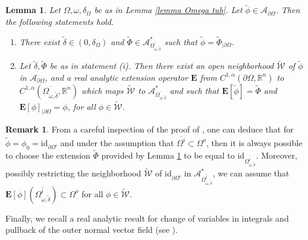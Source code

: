 \documentclass[11pt,reqno,a4paper]{amsart}
\theoremstyle{plain}
\newtheorem{lemma}[theorem]{Lemma}
\theoremstyle{definition}
\newtheorem{remark}[theorem]{Remark}
\newcommand{\R}{\mathbb{R}}
\begin{document}
\begin{lemma}\label{lemma extension operator}
    Let $\Omega, \omega,\delta_{\Omega}$ be as in Lemma \ref{lemma Omega tub}. Let $\tilde{\phi} \in \mathcal{A}_{\partial\Omega}$. Then the following statements hold.
    \begin{enumerate}
        \item[(i)] There exist $\tilde{\delta} \in (0,\delta_{\Omega})$ and $\tilde{\Phi} \in \mathcal{A}^*_{\overline{\Omega_{\omega,\tilde{\delta}}}}$ such that $\tilde{\phi} = {\tilde{\Phi}}_{|\partial\Omega}$.

        \item[(ii)] Let $\tilde{\delta}, \tilde{\Phi}$ be as in statement (i). Then there exist an open neighborhood $\tilde{\mathcal{W}}$ of $\tilde{\phi}$ in $\mathcal{A}_{\partial\Omega}$, and a real analytic extension operator $\mathbf{E}$ from $C^{1,\alpha}(\partial\Omega,\R^n)$ to $C^{1,\alpha}(\overline{\Omega_{\omega,\tilde{\delta}}}, \R^n)$ which maps $\tilde{\mathcal{W}}$ to $\mathcal{A}^*_{\overline{\Omega_{\omega,\tilde{\delta}}}}$ and such that $\mathbf{E}[\tilde{\phi}] = \tilde{\Phi}$ and $\mathbf{E}[\phi]_{|\partial\Omega} = \phi$, for all $\phi \in \tilde{\mathcal{W}}$.
    \end{enumerate}
\end{lemma}

\begin{remark}\label{remark Phi_0}
    From a careful inspection of the proof of \cite[Props.\,2.7\,\&\,2.8]{LaRo08}, one can deduce that for $\tilde{\phi} = \phi_0=\mathrm{id}_{\partial\Omega^i}$ and under the assumption that $\overline{\Omega^i} \subset \Omega^o$, then it is always possible to choose the extension $\tilde{\Phi}$ provided by Lemma \ref{lemma extension operator} to be equal to $\mathrm{id}_{\overline{\Omega^i_{\omega,\tilde{\delta}}}}$. Moreover, possibly restricting the neighborhood $\tilde{\mathcal{W}}$ of $\mathrm{id}_{\partial\Omega^i}$ in $\mathcal{A}^*_{\overline{\Omega^i_{\omega,\tilde{\delta}}}}$, we can assume that $\mathbf{E}[\phi]( \overline{\Omega^i_{\omega,\tilde{\delta}}}) \subset \Omega^o$ for all $\phi \in \tilde{\mathcal{W}}$.
\end{remark}

Finally, we recall a real analytic result for change of variables in integrals and pullback of the outer normal vector field (see \cite[Prop.\,1]{La07}). 
\end{document}
